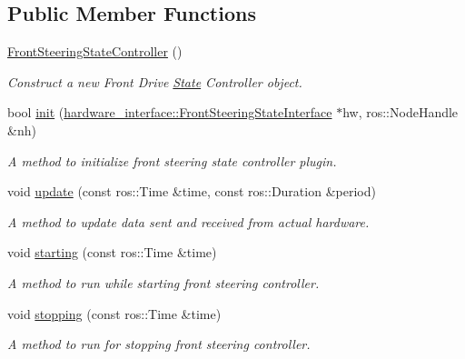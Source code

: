 \subsection*{Public Member Functions}
\begin{DoxyCompactItemize}
\item 
\mbox{\label{classfront__steering__state__controller_1_1FrontSteeringStateController_a9cc4c0139f25b6ca500c5e71e71b5dd7}} 
\hyperlink{classfront__steering__state__controller_1_1FrontSteeringStateController_a9cc4c0139f25b6ca500c5e71e71b5dd7}{Front\+Steering\+State\+Controller} ()
\begin{DoxyCompactList}\small\item\em Construct a new Front Drive \hyperlink{structState}{State} Controller object. \end{DoxyCompactList}\item 
bool \hyperlink{classfront__steering__state__controller_1_1FrontSteeringStateController_a8e5a8ca89d16e85900d3a79df1e75a29}{init} (\hyperlink{classhardware__interface_1_1FrontSteeringStateInterface}{hardware\+\_\+interface\+::\+Front\+Steering\+State\+Interface} $\ast$hw, ros\+::\+Node\+Handle \&nh)
\begin{DoxyCompactList}\small\item\em A method to initialize front steering state controller plugin. \end{DoxyCompactList}\item 
void \hyperlink{classfront__steering__state__controller_1_1FrontSteeringStateController_a3c8233a79607610b9c8c21084217268e}{update} (const ros\+::\+Time \&time, const ros\+::\+Duration \&period)
\begin{DoxyCompactList}\small\item\em A method to update data sent and received from actual hardware. \end{DoxyCompactList}\item 
void \hyperlink{classfront__steering__state__controller_1_1FrontSteeringStateController_acb8a5004ff18ed976ea25204947d0b94}{starting} (const ros\+::\+Time \&time)
\begin{DoxyCompactList}\small\item\em A method to run while starting front steering controller. \end{DoxyCompactList}\item 
void \hyperlink{classfront__steering__state__controller_1_1FrontSteeringStateController_a240b6e43acfd4f7ed4bfa159209183b6}{stopping} (const ros\+::\+Time \&time)
\begin{DoxyCompactList}\small\item\em A method to run for stopping front steering controller. \end{DoxyCompactList}\end{DoxyCompactItemize}


